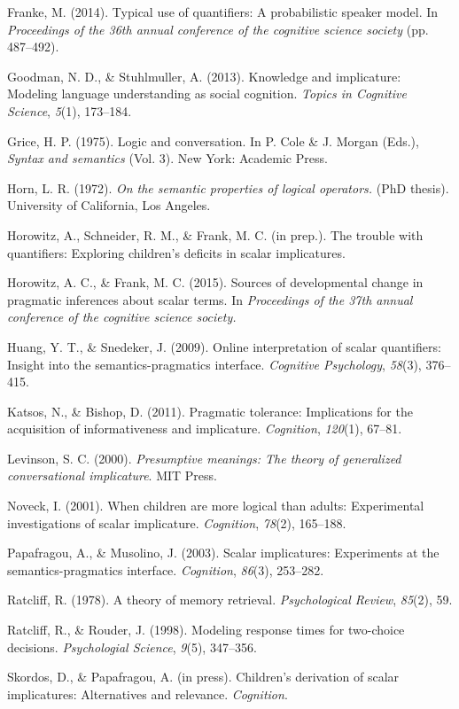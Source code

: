 \documentclass[10pt, letterpaper]{article}
\begin{document}
Franke, M. (2014). Typical use of quantifiers: A probabilistic speaker
model. In \emph{Proceedings of the 36th annual conference of the
cognitive science society} (pp. 487--492).

Goodman, N. D., \& Stuhlmuller, A. (2013). Knowledge and implicature:
Modeling language understanding as social cognition. \emph{Topics in
Cognitive Science}, \emph{5}(1), 173--184.

Grice, H. P. (1975). Logic and conversation. In P. Cole \& J. Morgan
(Eds.), \emph{Syntax and semantics} (Vol. 3). New York: Academic Press.

Horn, L. R. (1972). \emph{On the semantic properties of logical
operators.} (PhD thesis). University of California, Los Angeles.

Horowitz, A., Schneider, R. M., \& Frank, M. C. (in prep.). The trouble
with quantifiers: Exploring children's deficits in scalar implicatures.

Horowitz, A. C., \& Frank, M. C. (2015). Sources of developmental change
in pragmatic inferences about scalar terms. In \emph{Proceedings of the
37th annual conference of the cognitive science society.}

Huang, Y. T., \& Snedeker, J. (2009). Online interpretation of scalar
quantifiers: Insight into the semantics-pragmatics interface.
\emph{Cognitive Psychology}, \emph{58}(3), 376--415.

Katsos, N., \& Bishop, D. (2011). Pragmatic tolerance: Implications for
the acquisition of informativeness and implicature. \emph{Cognition},
\emph{120}(1), 67--81.

Levinson, S. C. (2000). \emph{Presumptive meanings: The theory of
generalized conversational implicature}. MIT Press.

Noveck, I. (2001). When children are more logical than adults:
Experimental investigations of scalar implicature. \emph{Cognition},
\emph{78}(2), 165--188.

Papafragou, A., \& Musolino, J. (2003). Scalar implicatures: Experiments
at the semantics-pragmatics interface. \emph{Cognition}, \emph{86}(3),
253--282.

Ratcliff, R. (1978). A theory of memory retrieval. \emph{Psychological
Review}, \emph{85}(2), 59.

Ratcliff, R., \& Rouder, J. (1998). Modeling response times for
two-choice decisions. \emph{Psychologial Science}, \emph{9}(5),
347--356.

Skordos, D., \& Papafragou, A. (in press). Children's derivation of
scalar implicatures: Alternatives and relevance. \emph{Cognition}.
\end{document}
